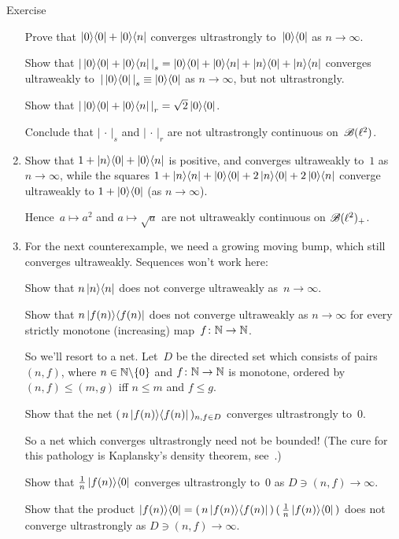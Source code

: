 \documentclass[a]{subfiles}
\begin{document}
\begin{parsec}
\begin{point}[vn-counterexamples]{Exercise}
\begin{enumerate}
Prove that $\left|0\right>\!\left<0\right| + \left|0\right>\!\left<n\right|$
converges ultrastrongly to~$\left|0\right>\!\left<0\right|$ as $n\to \infty$.

Show that $\left|\,\left|0\right>\!\left<0\right|+\left|0\right>\!\left<n\right|\,\right|_s
= \left|0\right>\!\left<0\right|
+\left|0\right>\!\left<n\right|
+\left|n\right>\!\left<0\right|
+\left|n\right>\!\left<n\right|$
converges ultraweakly to~$\left|\,\left|0\right>\!\left<0\right|\,\right|_s
\equiv \left|0\right>\!\left<0\right|$
as $n\to \infty$,
but not ultrastrongly.

Show that $\left|\,\left|0\right>\!\left<0\right|+\left|0\right>\!\left<n\right|\,\right|_r
= \sqrt{2} \left|0\right>\!\left<0\right|$.

Conclude that $\left|\,\cdot\,\right|_s$
and $\left|\,\cdot\,\right|_r$
are not ultrastrongly continuous on~$\mathscr{B}(\ell^2)$.

\item
Show that $1+\left|n\right>\!\left<0\right|+\left|0\right>\!\left<n\right|$
is positive,
and 
converges ultraweakly to~$1$ as~$n\to\infty$,
while the squares
$1+\left|n\right>\!\left<n\right|+\left|0\right>\!\left<0\right|+2\left|n\right>\!\left<0\right|+2\left|0\right>\!\left<n\right|$
converge ultraweakly to $1+\left|0\right>\!\left<0\right|$
(as $n\to\infty$).

Hence~$a\mapsto a^2$
and $a\mapsto \sqrt{a}$
are not ultraweakly continuous on $\mathscr{B}(\ell^2)_{+}$.

\item
For the next counterexample,
we need a growing moving bump,
which still converges ultraweakly.
Sequences won't work here:

Show that $n\left|n\right>\!\left<n\right|$ does not converge ultraweakly as~$n\to\infty$.

Show that $n \left|f(n)\right>\!\left<f(n)\right|$ does not converge ultraweakly
as $n\to\infty$
for every strictly monotone (increasing) map~$f\colon \mathbb{N}\to\mathbb{N}$.

So we'll resort to a net.
Let~$D$ be the directed set which consists of pairs $(n,f)$,
where $n\in \mathbb{N}\backslash\{0\}$ and $f\colon \mathbb{N}\to\mathbb{N}$
is monotone, ordered by $(n,f)\leq (m,g)$ iff $n\leq m$ and $f\leq g$.

Show that the net $(\, n\left|f(n)\right>\!\left<f(n)\right|\,)_{n,f\in D}$
converges ultrastrongly to~$0$.

So a net which converges ultrastrongly need not be bounded!
(The cure for this pathology is Kaplansky's density theorem, 
see~.)

Show that $\frac{1}{n} \left|f(n)\right>\!\left<0\right|$
converges ultrastrongly to~$0$ as $D\ni(n,f)\to \infty$.

Show that the product
$\left|f(n)\right>\!\left<0\right| = (\,n\left|f(n)\right>\!\left<f(n)\right|\,)\,(\,\frac{1}{n}
\left|f(n)\right>\!\left<0\right|\,)$
does not converge ultrastrongly 
as $D\ni(n,f)\to\infty$.


\end{enumerate}
\end{point}
\end{parsec}
\end{document}
